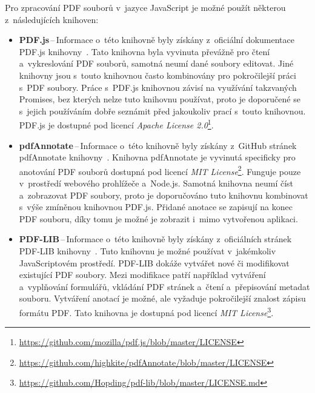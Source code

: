 Pro zpracování PDF souborů v~jazyce JavaScript je možné použít některou
z~následujících knihoven:
\begin{itemize}
    \item \textbf{PDF.js}\,--\,Informace o~této knihovně byly získány
    z~oficiální dokumentace PDF.js knihovny~\cite{PDFjs}.
    Tato knihovna byla vyvinuta převážně pro čtení a~vykreslování PDF
    souborů, samotná neumí dané soubory editovat. Jiné knihovny jsou s~touto
    knihovnou často kombinovány pro pokročilejší práci s~PDF soubory. Práce
    s~PDF.js knihovnou závisí na využívání takzvaných Promises, bez kterých nelze
    tuto knihovnu používat, proto je doporučené se s~jejich používáním dobře
    seznámit před jakoukoliv prací s~touto knihovnou. PDF.js je dostupné pod
    licencí \emph{Apache License 2.0}\footnote{
    \href{https://github.com/mozilla/pdf.js/blob/master/LICENSE}{https://github.com/mozilla/pdf.js/blob/master/LICENSE}}.
    
    \item \textbf{pdfAnnotate}\,--\,Informace o~této knihovně byly získány
    z~GitHub stránek pdfAnnotate knihovny~\cite{pdfAnnotate}.
    Knihovna pdfAnnotate je vyvinutá specificky pro anotování PDF souborů dostupná pod
    licencí \emph{MIT License}\footnote{
    \href{https://github.com/highkite/pdfAnnotate/blob/master/LICENSE}{https://github.com/highkite/pdfAnnotate/blob/master/LICENSE}
    }. Funguje pouze v~prostředí webového prohlížeče a~Node.js. Samotná knihovna
    neumí číst a~zobrazovat PDF soubory, proto je doporučováno tuto knihovnu
    kombinovat s~výše zmíněnou knihovnou PDF.js. Přidané anotace se zapisují
    na konec PDF souboru, díky tomu je možné je zobrazit i~mimo vytvořenou
    aplikaci.
    
    \item \textbf{PDF-LIB}\,--\,Informace o~této knihovně byly získány
    z~oficiálních stránek PDF-LIB knihovny~\cite{pdf_lib}.
    Tuto knihovnu je možné používat v~jakémkoliv JavaScriptovém prostředí.
    PDF-LIB dokáže vytvářet nové či modifikovat existující PDF soubory. Mezi
    modifikace patří například vytváření a~vyplňování formulářů, vkládání PDF
    stránek a~čtení a~přepisování metadat souboru. Vytváření anotací je možné, ale
    vyžaduje pokročilejší znalost zápisu formátu PDF. Tato knihovna je dostupná
    pod licencí \emph{MIT License}\footnote{
    \href{https://github.com/Hopding/pdf-lib/blob/master/LICENSE.md}{https://github.com/Hopding/pdf-lib/blob/master/LICENSE.md}
    }.
\end{itemize}


